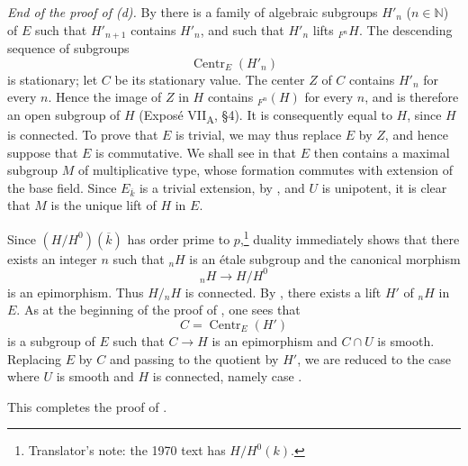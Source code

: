 \smallskip
\noindent
\emph{End of the proof of (d).}
By  there is a family of algebraic subgroups
\(H'_n\) (\(n\in\mathbb N\)) of \(E\) such that
\(H'_{n+1}\) contains \(H'_n\), and such that \(H'_n\) lifts
\({}_{F^n}H\).  The descending sequence of subgroups
\[
  \operatorname{Centr}_E(H'_n)
\]
is stationary; let \(C\) be its stationary value.  The center \(Z\)
of \(C\) contains \(H'_n\) for every \(n\).  Hence the image of
\(Z\) in \(H\) contains \({}_{F^n}(H)\) for every \(n\), and is
therefore an open subgroup of \(H\) (Exposé VII\textsubscript{A},
\S 4).  It is consequently equal to \(H\), since \(H\) is
connected.  To prove that \(E\) is trivial, we may thus replace
\(E\) by \(Z\), and hence suppose that \(E\) is commutative.  We
shall see in  that \(E\) then contains a maximal subgroup \(M\)
of multiplicative type, whose formation commutes with extension of
the base field.  Since \(E_{\overline{k}}\) is a trivial extension,
by , and \(U\) is unipotent, it is clear that \(M\) is
the unique lift of \(H\) in \(E\).

Since \((H/H^0)(\overline{k})\) has order prime to \(p\),\footnote{Translator's note: the 1970 text has
\(H/H^0(k)\).} duality
immediately shows that there exists an integer \(n\) such that
\({}_nH\) is an étale subgroup and the canonical morphism
\[
  {}_nH\longrightarrow H/H^0
\]
is an epimorphism.  Thus \(H/{}_nH\) is connected.  By ,
there exists a lift \(H'\) of \({}_nH\) in \(E\).  As at the
beginning of the proof of , one sees that
\[
  C=\operatorname{Centr}_E(H')
\]
is a subgroup of \(E\) such that \(C\longrightarrow H\) is an
epimorphism and \(C\cap U\) is smooth.  Replacing \(E\) by \(C\)
and passing to the quotient by \(H'\), we are reduced to the case
where \(U\) is smooth and \(H\) is connected, namely case .

This completes the proof of .
